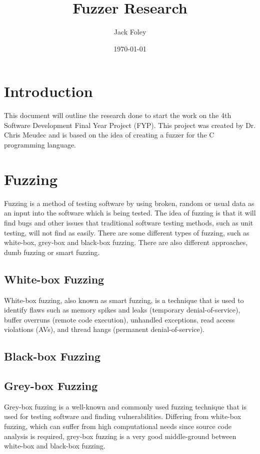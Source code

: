 \documentclass[a4paper,12pt]{article}
\title{Fuzzer Research}
\author{Jack Foley}
\date{\today}
\begin{document}
\maketitle

\clearpage
{}
\tableofcontents

\clearpage
{}
\section{Introduction}
This document will outline the research done to start the work on the 4th Software Development Final Year Project (FYP). This project was created by Dr. Chris Meudec and is based on the idea of creating a fuzzer for the C programming language.

\section{Fuzzing}
Fuzzing is a method of testing software by using broken, random or usual data as an input into the software
which is being tested. The idea of fuzzing is that it will find bugs and other issues that traditional 
software testing methods, such as unit testing, will not find as easily. There are some different types of 
fuzzing, such as white-box, grey-box and black-box fuzzing. There are also different approaches, dumb fuzzing 
or smart fuzzing.

\subsection{White-box Fuzzing}
White-box fuzzing, also known as smart fuzzing, is a technique that is used to identify flaws such as memory 
spikes and leaks (temporary denial-of-service), buffer overruns (remote code execution), unhandled exceptions, 
read access violations (AVs), and thread hangs (permanent denial-of-service). 
\cite{neystadt2009}

\subsection{Black-box Fuzzing}

\subsection{Grey-box Fuzzing}
Grey-box fuzzing is a well-known and commonly used fuzzing technique that is used for testing software and 
finding vulnerabilities. Differing from white-box fuzzing, which can suffer from high computational needs since
source code analysis is required, grey-box fuzzing is a very good middle-ground between white-box and black-box
fuzzing.
\cite{8839290}

\clearpage
\printbibliography
\end{document}
